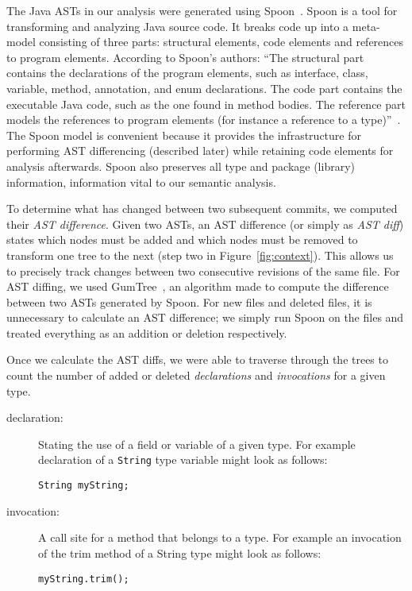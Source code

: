 The Java ASTs in our analysis were generated using Spoon~\cite{pawlak:hal-01169705}. Spoon is a tool for transforming and analyzing Java source code. It breaks code up into a meta-model consisting of three parts: structural elements, code elements and references to program elements. According to Spoon's authors: ``The structural part contains the declarations of the program elements, such as interface, class, variable, method, annotation, and enum declarations.  The code part contains the executable Java code, such as the one found in method bodies. The reference part models the references to program elements (for instance a reference to a type)''~\cite{pawlak:hal-01169705}. The Spoon model is convenient because it provides the infrastructure for performing AST differencing (described later) while retaining code elements for analysis afterwards. Spoon also preserves all type and package (library) information, information vital to our semantic analysis.

To determine what has changed between two subsequent commits, we computed their \emph{AST difference}. Given two ASTs, an AST difference (or simply as \emph{AST diff}) states which nodes must be added and which nodes must be removed to transform one tree to the next (step two in Figure~\ref{fig:context}). This allows us to precisely track changes between two consecutive revisions of the same file. For AST diffing, we used GumTree~\cite{falleri:hal-01054552}, an algorithm made to compute the difference between two ASTs generated by Spoon. For new files and deleted files, it is unnecessary to calculate an AST difference; we simply run Spoon on the files and treated everything as an addition or deletion respectively.

Once we calculate the AST diffs, we were able to traverse through the trees to count the number of added or deleted \emph{declarations} and \emph{invocations} for a given type.

\begin{description}
\item [declaration:]
  Stating the use of a field or variable of a given type. For example declaration of a \texttt{String} type variable might look as follows:
  \\
  \begin{adjustwidth}{2.5em}{0pt}
  \texttt{String myString;} \\
  \end{adjustwidth}
\item [invocation:]
  A call site for a method that belongs to a type. For example an invocation of the trim method of a String type might look as follows:
  \\
  \begin{adjustwidth}{2.5em}{0pt}
  \texttt{myString.trim();} \\
  \end{adjustwidth}
\end{description}

